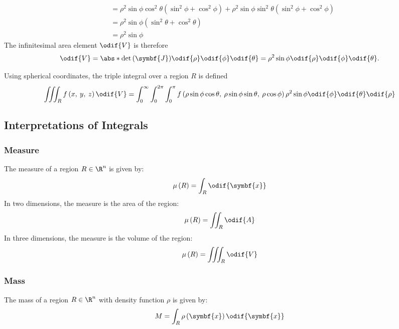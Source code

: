 \documentclass{article}
\begin{document}
\begin{definition}
\begin{align*}
                                       & = \rho^2 \sin{\phi} \cos^2{\theta} \left( \sin^2{\phi} + \cos^2{\phi} \right) + \rho^2 \sin{\phi} \sin^2{\theta} \left( \sin^2{\phi} + \cos^2{\phi} \right)                                          \\
                                       & = \rho^2 \sin{\phi} \left( \sin^2{\theta} + \cos^2{\theta} \right)                                                                                                                                   \\
                                       & = \rho^2 \sin{\phi}
    \end{align*}
    The infinitesimal area element \(\odif{V}\) is therefore
    \begin{equation*}
        \odif{V} = \abs*{\det{\left( \symbf{J} \right)}} \odif{\rho}\odif{\phi}\odif{\theta} = \rho^2 \sin{\phi} \odif{\rho}\odif{\phi}\odif{\theta}.
    \end{equation*}
\end{definition}
Using spherical coordinates, the triple integral over a region \(R\) is
defined
\begin{equation*}
    \iiint_R f\left( x,\: y,\: z \right) \odif{V} = \int_0^\infty \int_0^{2\pi} \int_0^\pi f\left( \rho \sin{\phi} \cos{\theta},\: \rho \sin{\phi} \sin{\theta},\: \rho \cos{\phi} \right) \rho^2 \sin{\phi} \odif{\phi} \odif{\theta} \odif{\rho}
\end{equation*}
\subsection{Interpretations of Integrals}
\subsubsection*{Measure}
The measure of a region \(R \in \R^n\) is given by:
\begin{equation*}
    \mu\left( R \right) = \int_R \odif{\symbf{x}}
\end{equation*}
In two dimensions, the measure is the area of the region:
\begin{equation*}
    \mu\left( R \right) = \iint_R \odif{A}
\end{equation*}
In three dimensions, the measure is the volume of the region:
\begin{equation*}
    \mu\left( R \right) = \iiint_R \odif{V}
\end{equation*}
\subsubsection*{Mass}
The mass of a region \(R \in \R^n\) with density function \(\rho\) is
given by:
\begin{equation*}
    M = \int_R \rho\left( \symbf{x} \right) \odif{\symbf{x}}
\end{equation*}
\end{document}
